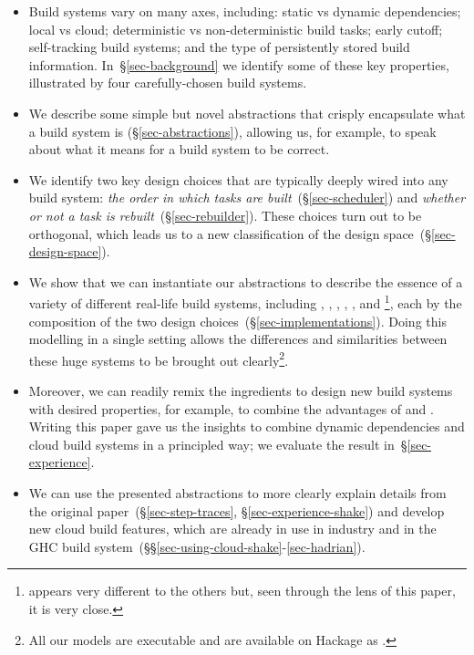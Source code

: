 \begin{itemize}
\item Build systems vary on many axes, including: static vs dynamic
  dependencies; local vs cloud; deterministic vs non-deterministic build tasks;
  early cutoff; self-tracking build systems; and the type of persistently stored
  build information. In~\S\ref{sec-background} we identify some of these key
  properties, illustrated by four carefully-chosen build systems.

\item We describe some simple but novel abstractions that
  crisply encapsulate what a build system is (\S\ref{sec-abstractions}),
  allowing us, for example, to speak about what it means for a build system to
  be correct.

\item We identify two key design choices that are typically deeply wired into
  any build system: \emph{the order in which tasks are
  built}~(\S\ref{sec-scheduler}) and \emph{whether or not a
  task is rebuilt}~(\S\ref{sec-rebuilder}). These choices turn out to
  be orthogonal, which leads us to a new classification of the design
  space~(\S\ref{sec-design-space}).

\item We show that we can instantiate our abstractions to describe the essence
of a variety of different real-life build systems, including \Make, \Shake,
\Bazel, \Buck, \Nix, and \Excel\footnote{\Excel appears very different to the
others but, seen through the lens of this paper, it is very close.}, each by the
composition of the two design choices~(\S\ref{sec-implementations}). Doing this
modelling in a single setting allows the differences and similarities between
these huge systems to be brought out clearly\footnote{All our models are
executable and are available on Hackage as .}.

\item Moreover, we can readily remix the ingredients to design new build systems
with desired properties, for example, to combine the advantages of \Shake and
\Bazel. Writing this paper gave us the insights to combine dynamic dependencies
and cloud build systems in a principled way; we evaluate the result
in~\S\ref{sec-experience}.

\item We can use the presented abstractions to more clearly explain details from
the original \Shake paper~(\S\ref{sec-step-traces}, \S\ref{sec-experience-shake})
and develop new cloud build features, which are already in use in industry and in
the GHC build system~(\S\S\ref{sec-using-cloud-shake}-\ref{sec-hadrian}).

\end{itemize}

